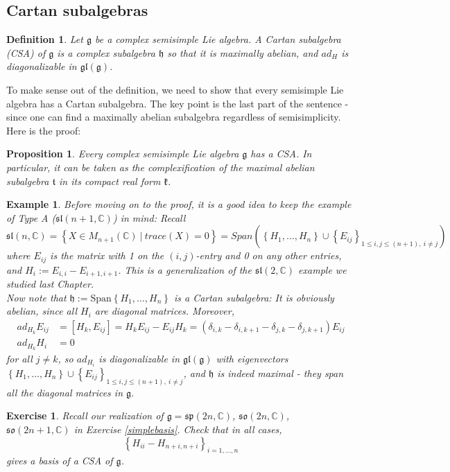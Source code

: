 \documentclass[11pt]{article}
\newtheorem{proposition}[theorem]{Proposition}
\newtheorem{example}[theorem]{Example}
\newtheorem{exercise}[theorem]{Exercise}
\newtheorem{definition}[theorem]{Definition}
\newcommand{\bb}[1]{\mathbb{#1}}
\newcommand{\mf}[1]{\mathfrak{#1}}
\begin{document}
\subsection{Cartan subalgebras}
\begin{definition}
Let $\mf{g}$ be a complex semisimple Lie algebra. A Cartan subalgebra (CSA) of $\mf{g}$ is a complex subalgebra $\mf{h}$ so that it is maximally abelian, and $ad_H$ is diagonalizable in $\mf{gl}(\mf{g})$.
\end{definition}
To make sense out of the definition, we need to show that every semisimple Lie algebra has a Cartan subalgebra. The key point is the last part of the sentence - since one can find a maximally abelian subalgebra regardless of semisimplicity. Here is the proof:
\begin{proposition}
Every complex semisimple Lie algebra $\mf{g}$ has a CSA. In particular, it can be taken as the complexification of the maximal abelian subalgebra $\mf{t}$ in its compact real form $\mf{k}$.
\end{proposition}
\begin{example}
Before moving on to the proof, it is a good idea to keep the example of Type A ($\mf{sl}(n+1,\bb{C})$) in mind: Recall
$$\mf{sl}(n,\bb{C}) = \left\{X \in M_{n+1}(\bb{C})\ \Big|\ trace(X) = 0 \right\} = Span(\left\{ H_1, \dots, H_n \right\} \cup \left\{E_{ij} \right\}_{1 \leq i,j \leq (n+1),\ i \neq j })$$
where $E_{ij}$ is the matrix with 1 on the $(i,j)$-entry and 0 on any other entries, and $H_i := E_{i,i} - E_{i+1,i+1}$. This is a generalization of the $\mf{sl}(2,\bb{C})$ example we studied last Chapter.\\
Now note that $\mf{h} := \mathrm{Span}\left\{ H_1, \dots, H_n \right\}$ is a Cartan subalgebra: It is obviously abelian, since all $H_i$ are diagonal matrices. Moreover,
\begin{align} \label{bracketrel}
ad_{H_k}E_{ij} &= [H_k, E_{ij}] = H_kE_{ij} - E_{ij}H_k = (\delta_{i,k} - \delta_{i,k+1} - \delta_{j,k} - \delta_{j, k+1})E_{ij}\\
ad_{H_k}H_i &= 0
\end{align}
for all $j \neq k$, so $ad_{H_i}$ is diagonalizable in $\mf{gl}(\mf{g})$ with eigenvectors $\left\{ H_1, \dots, H_n \right\} \cup \left\{E_{ij} \right\}_{1 \leq i,j \leq (n+1),\ i \neq j }$, and $\mf{h}$ is indeed maximal - they span all the diagonal matrices in $\mf{g}$.
\end{example}
\begin{exercise}
Recall our realization of $\mf{g} = \mf{sp}(2n,\bb{C})$, $\mf{so}(2n,\bb{C})$, $\mf{so}(2n+1,\bb{C})$ in Exercise \ref{simplebasis}. Check that in all cases,
$$\left\{ H_{ii} - H_{n+i, n+i}\right\}_{i = 1, \dots, n}$$
gives a basis of a CSA of $\mf{g}$.
\end{exercise}
\end{document}
